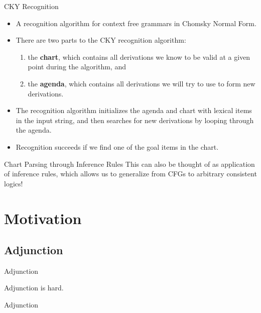 \documentclass{beamer}
\begin{document}
\begin{frame}{CKY Recognition}
  \begin{itemize}
  \item A recognition algorithm for context free grammars in Chomsky
    Normal Form.
  \item There are two parts to the CKY recognition algorithm:
    \begin{enumerate}
    \item the \textbf{chart}, which contains all derivations we know
      to be valid at a given point during the algorithm, and
    \item the \textbf{agenda}, which contains all derivations we will
      try to use to form new derivations.
    \end{enumerate}
  \item The recognition algorithm initializes the agenda and chart
    with lexical items in the input string, and then searches for new
    derivations by looping through the agenda.
  \item Recognition succeeds if we find one of the goal items in the
    chart.
  \end{itemize}
\end{frame}

\begin{frame}{Chart Parsing through Inference Rules}
  This can also be thought of as application of inference rules, which
  allows us to generalize from CFGs to arbitrary consistent logics!
\end{frame}

\section{Motivation}

\subsection{Adjunction}
\begin{frame}{Adjunction}
  \pause
  \begin{center}
    \Huge Adjunction is hard.
  \end{center}
\end{frame}

\begin{frame}{Adjunction}
  \begin{exe}
  \end{exe}
\end{frame}
\end{document}
